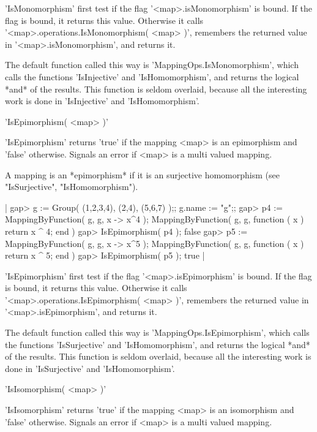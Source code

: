 'IsMonomorphism' first test if the flag  '<map>.isMonomorphism' is bound.
If the  flag is  bound,  it  returns  this  value.   Otherwise  it  calls
'<map>.operations.IsMonomorphism(  <map> )', remembers the returned value
in '<map>.isMonomorphism', and returns it.

The  default function  called  this  way  is 'MappingOps.IsMonomorphism',
which calls the functions 'IsInjective' and 'IsHomomorphism', and returns
the logical  *and*  of the  results.   This  function is seldom overlaid,
because  all  the  interesting   work  is   done  in   'IsInjective'  and
'IsHomomorphism'.


'IsEpimorphism( <map> )'

'IsEpimorphism' returns 'true' if the mapping <map> is an epimorphism and
'false' otherwise.  Signals an error if <map> is a multi valued mapping.

A mapping is an *epimorphism*  if  it is an surjective  homomorphism (see
"IsSurjective", "IsHomomorphism").

|    gap> g := Group( (1,2,3,4), (2,4), (5,6,7) );;  g.name := "g";;
    gap> p4 := MappingByFunction( g, g, x -> x^4 );
    MappingByFunction( g, g, function ( x )
        return x ^ 4;
    end )
    gap> IsEpimorphism( p4 );
    false
    gap> p5 := MappingByFunction( g, g, x -> x^5 );
    MappingByFunction( g, g, function ( x )
        return x ^ 5;
    end )
    gap> IsEpimorphism( p5 );
    true |

'IsEpimorphism' first test if the  flag '<map>.isEpimorphism'  is  bound.
If  the  flag  is  bound,  it  returns this  value.  Otherwise  it  calls
'<map>.operations.IsEpimorphism( <map> )',  remembers the  returned value
in '<map>.isEpimorphism', and returns it.

The default function called this way is 'MappingOps.IsEpimorphism', which
calls the functions  'IsSurjective' and 'IsHomomorphism', and returns the
logical *and* of the results.  This function is seldom  overlaid, because
all the interesting work is done in 'IsSurjective' and 'IsHomomorphism'.


'IsIsomorphism( <map> )'

'IsIsomorphism' returns 'true' if the mapping <map> is an isomorphism and
'false' otherwise.  Signals an error if <map> is a multi valued mapping.

